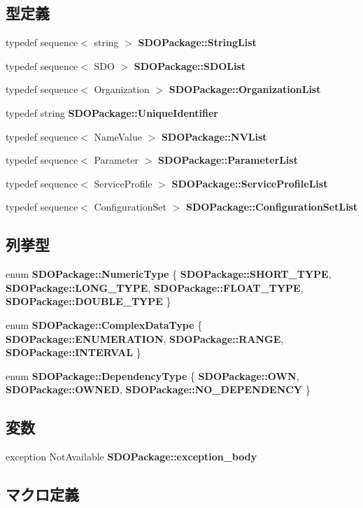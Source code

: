 \subsection*{型定義}
\begin{DoxyCompactItemize}
\item 
typedef sequence$<$ string $>$ {\bf SDOPackage::StringList}
\item 
typedef sequence$<$ SDO $>$ {\bf SDOPackage::SDOList}
\item 
typedef sequence$<$ Organization $>$ {\bf SDOPackage::OrganizationList}
\item 
typedef string {\bf SDOPackage::UniqueIdentifier}
\item 
typedef sequence$<$ NameValue $>$ {\bf SDOPackage::NVList}
\item 
typedef sequence$<$ Parameter $>$ {\bf SDOPackage::ParameterList}
\item 
typedef sequence$<$ ServiceProfile $>$ {\bf SDOPackage::ServiceProfileList}
\item 
typedef sequence$<$ ConfigurationSet $>$ {\bf SDOPackage::ConfigurationSetList}
\end{DoxyCompactItemize}
\subsection*{列挙型}
\begin{DoxyCompactItemize}
\item 
enum {\bf SDOPackage::NumericType} \{ {\bf SDOPackage::SHORT\_\-TYPE}, 
{\bf SDOPackage::LONG\_\-TYPE}, 
{\bf SDOPackage::FLOAT\_\-TYPE}, 
{\bf SDOPackage::DOUBLE\_\-TYPE}
 \}
\item 
enum {\bf SDOPackage::ComplexDataType} \{ {\bf SDOPackage::ENUMERATION}, 
{\bf SDOPackage::RANGE}, 
{\bf SDOPackage::INTERVAL}
 \}
\item 
enum {\bf SDOPackage::DependencyType} \{ {\bf SDOPackage::OWN}, 
{\bf SDOPackage::OWNED}, 
{\bf SDOPackage::NO\_\-DEPENDENCY}
 \}
\end{DoxyCompactItemize}
\subsection*{変数}
\begin{DoxyCompactItemize}
\item 
exception NotAvailable {\bf SDOPackage::exception\_\-body}
\end{DoxyCompactItemize}


\subsection{マクロ定義}
